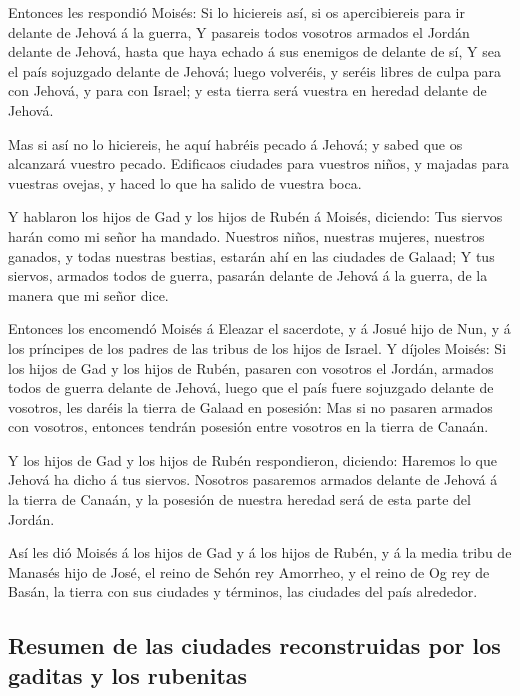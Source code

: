  Entonces les respondió Moisés: Si lo hiciereis así, si
os apercibiereis para ir delante de Jehová á la guerra, 
Y pasareis todos vosotros armados el Jordán delante de Jehová, hasta que
haya echado á sus enemigos de delante de sí,  Y sea el
país sojuzgado delante de Jehová; luego volveréis, y seréis libres de
culpa para con Jehová, y para con Israel; y esta tierra será vuestra en
heredad delante de Jehová.

 Mas si así no lo hiciereis, he aquí habréis pecado á
Jehová; y sabed que os alcanzará vuestro pecado. 
Edificaos ciudades para vuestros niños, y majadas para vuestras ovejas,
y haced lo que ha salido de vuestra boca.

 Y hablaron los hijos de Gad y los hijos de Rubén á
Moisés, diciendo: Tus siervos harán como mi señor ha mandado.
 Nuestros niños, nuestras mujeres, nuestros ganados, y
todas nuestras bestias, estarán ahí en las ciudades de Galaad;
 Y tus siervos, armados todos de guerra, pasarán delante
de Jehová á la guerra, de la manera que mi señor dice.

 Entonces los encomendó Moisés á Eleazar el sacerdote, y
á Josué hijo de Nun, y á los príncipes de los padres de las tribus de
los hijos de Israel.  Y díjoles Moisés: Si los hijos de
Gad y los hijos de Rubén, pasaren con vosotros el Jordán, armados todos
de guerra delante de Jehová, luego que el país fuere sojuzgado delante
de vosotros, les daréis la tierra de Galaad en posesión: 
Mas si no pasaren armados con vosotros, entonces tendrán posesión entre
vosotros en la tierra de Canaán.

 Y los hijos de Gad y los hijos de Rubén respondieron,
diciendo: Haremos lo que Jehová ha dicho á tus siervos. 
Nosotros pasaremos armados delante de Jehová á la tierra de Canaán, y la
posesión de nuestra heredad será de esta parte del Jordán.

 Así les dió Moisés á los hijos de Gad y á los hijos de
Rubén, y á la media tribu de Manasés hijo de José, el reino de Sehón rey
Amorrheo, y el reino de Og rey de Basán, la tierra con sus ciudades y
términos, las ciudades del país alrededor.

\hypertarget{resumen-de-las-ciudades-reconstruidas-por-los-gaditas-y-los-rubenitas}{%
\subsection{Resumen de las ciudades reconstruidas por los gaditas y los
rubenitas}\label{resumen-de-las-ciudades-reconstruidas-por-los-gaditas-y-los-rubenitas}}

